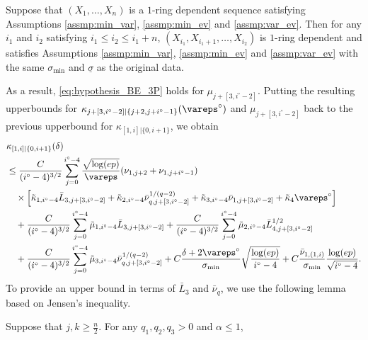 \documentclass[aos]{imsart}
\begin{document}
\begin{appendix}
\begin{lemma} \label{thm:assmp_induction_P}
    Suppose that $(X_1, \dots, X_n)$ is a $1$-ring dependent sequence satisfying Assumptions \eqref{assmp:min_var}, \eqref{assmp:min_ev} and \eqref{assmp:var_ev}. Then for any $i_1$ and $i_2$ satisfying $i_1 \leq i_2 \leq i_1+n$, $(X_{i_1}, X_{i_1+1}, \dots, X_{i_2})$ is $1$-ring dependent and satisfies Assumptions \eqref{assmp:min_var}, \eqref{assmp:min_ev} and \eqref{assmp:var_ev} with the same $\sigma_{\min}$ and $\underline{\sigma}$ as the original data.
\end{lemma}
As a result, \eqref{eq:hypothesis_BE_3P} holds for $\mu_{j+[3,i^\circ-2]}$. Putting the resulting upperbounds for $\kappa_{j+[3,i^\circ-2]|\{j+2, j+i^\circ-1\}}(\vareps^\circ)$ and $\mu_{j+[3,i^\circ-2]}$ back to the previous upperbound for $\kappa_{[1,i]|\{0,i+1\}}$, we obtain
\begin{equation*} %
\begin{aligned}
    & \kappa_{[1,i]|\{0,i+1\}}(\delta) \\
    & \leq \frac{C}{(i^\circ-4)^{3/2}} \sum_{j=0}^{i^\circ-4}  
    \frac{\sqrt{\log(ep)}}{\vareps} (\nu_{1,j+2} + \nu_{1,j+i^\circ-1})
    \\
    & \quad \times \left[ 
        \tilde\kappa_{1,i^\circ-4} \bar{L}_{3,j+[3,i^\circ-2]}
        + \tilde\kappa_{2,i^\circ-4} \bar{\nu}_{q,j+[3,i^\circ-2]}^{1/(q-2)}
        + \tilde\kappa_{3,i^\circ-4} \bar\nu_{1,j+[3,i^\circ-2]}
        + \tilde\kappa_{4} {\vareps^\circ}
    \right]
    \\
    & \quad + \frac{C}{(i^\circ-4)^{3/2}} \sum_{j=0}^{i^\circ-4} \tilde\mu_{1,i^\circ-4} {\bar{L}_{3,j+[3,i^\circ-2]}}
    + \frac{C}{(i^\circ-4)^{3/2}} \sum_{j=0}^{i^\circ-4} \tilde\mu_{2,i^\circ-4} {\bar{L}_{4,j+[3,i^\circ-2]}^{1/2}} \\
    &\quad + \frac{C}{(i^\circ-4)^{3/2}} \sum_{j=0}^{i^\circ-4} \tilde\mu_{3,i^\circ-4} {\bar{\nu}_{q,j+[3,i^\circ-2]}^{1/(q-2)}}
    + C\frac{\delta + 2\vareps^\circ}{\sigma_{\min}} \sqrt{\frac{\log(ep)}{i^\circ-4}}
    + C\frac{\bar\nu_{1,(1,i)}}{\sigma_{\min}} \frac{\log(ep)}{\sqrt{i^\circ-4}}.
\end{aligned}
\end{equation*}
To provide an upper bound in terms of $\bar{L}_3$ and $\bar{\nu}_q$, we use the following lemma based on Jensen's inequality.
\begin{lemma} \label{thm:jensen} 
    Suppose that $j, k \geq \frac{n}{2}$. For any $q_1, q_2, q_3 > 0$ and $\alpha \leq 1$,
    \begin{equation*}

\end{equation*}
\end{lemma}
\end{appendix}
\end{document}

